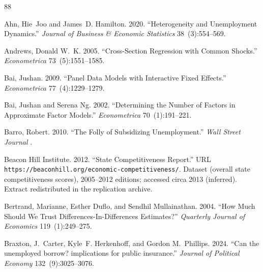 \documentclass[12pt]{article}
\newcommand{\1}{\mathbf{1}}
\begin{document}
\singlespacing
%
\begin{thebibliography}{88}
\newcommand{\enquote}[1]{``#1''}
\providecommand{\natexlab}[1]{#1}
\providecommand{\url}[1]{\texttt{#1}}
\providecommand{\urlprefix}{URL }

Ahn, Hie~Joo and James~D. Hamilton. 2020.
\newblock \enquote{Heterogeneity and Unemployment Dynamics.}
\newblock \emph{Journal of Business \& Economic Statistics} 38~(3):554--569.

Andrews, Donald W.~K. 2005.
\newblock \enquote{Cross-Section Regression with Common Shocks.}
\newblock \emph{Econometrica} 73~(5):1551--1585.

Bai, Jushan. 2009.
\newblock \enquote{Panel Data Models with Interactive Fixed Effects.}
\newblock \emph{Econometrica} 77~(4):1229--1279.

Bai, Jushan and Serena Ng. 2002.
\newblock \enquote{Determining the Number of Factors in Approximate Factor Models.}
\newblock \emph{Econometrica} 70~(1):191--221.

Barro, Robert. 2010.
\newblock \enquote{The Folly of Subsidizing Unemployment.}
\newblock \emph{Wall Street Journal} .

{Beacon Hill Institute}. 2012.
\newblock \enquote{State Competitiveness Report.}
\newblock \urlprefix\url{https://beaconhill.org/economic-competitiveness/}.
\newblock Dataset (overall state competitiveness scores), 2005--2012 editions; accessed circa 2013 (inferred). Extract redistributed in the replication archive.

Bertrand, Marianne, Esther Duflo, and Sendhil Mullainathan. 2004.
\newblock \enquote{How Much Should We Trust Differences-In-Differences Estimates?}
\newblock \emph{Quarterly Journal of Economics} 119~(1):249--275.

Braxton, J.~Carter, Kyle~F. Herkenhoff, and Gordon M.~Phillips. 2024.
\newblock \enquote{Can the unemployed borrow? implications for public insurance.}
\newblock \emph{Journal of Political Economy} 132~(9):3025--3076.


\end{thebibliography}
\end{document}
